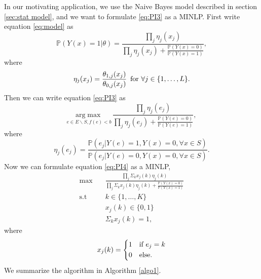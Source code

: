 \documentclass[opre,nonblindrev]{informs3} %
\newcommand{\Prob}{\mathbb{P}}
\begin{document}
In our motivating application, we use the Naive Bayes model described in section \ref{sec:stat model}, and we want to formulate \eqref{eq:PI3} as a MINLP. First write equation \eqref{eq:model} as
\begin{equation} \label{model1}
\Prob\left(Y(x) = 1 | \theta\right) =
\frac{\prod_j \eta_j(x_j)}{\prod_j \eta_j(x_j) + \frac{\Prob(Y(x)=0)}{\Prob(Y(x)=1)}},
\end{equation}
where
\begin{equation*}
\eta_j(x_j) = \frac{\theta_{1,j}(x_j)}{\theta_{0,j}(x_j)} \text{\,\,\,for $\forall j \in \{1,\ldots,L\}$}. 
\end{equation*}
Then we can write equation \eqref{eq:PI3} as
\begin{equation} \label{eq:PI4}
\underset{e \in E \backslash S, f(e)<b}{\mathrm{arg}\max} \, \frac{\prod_j \eta_j(e_j)}{\prod_j \eta_j(e_j) + \frac{\Prob(Y(e)=0)}{\Prob(Y(e)=1)}},
\end{equation}
where 
\begin{equation*}
\eta_j(e_j)=\frac{\Prob(e_j|Y(e)=1,Y(x)=0, \forall x \in S)}{\Prob(e_j|Y(e)=0,Y(x)=0, \forall x \in S)}.
\end{equation*}
Now we can formulate equation \eqref{eq:PI4} as a MINLP,
\begin{equation} \label{eq:PI5}
\begin{split}
\max \quad &\frac{\prod_j \Sigma_k x_j(k) \eta_j(k)}{\prod_j \Sigma_k x_j(k) \eta_j(k) + \frac{\Prob(Y(x)=0)}{\Prob(Y(x)=1)}} \\
\text{s.t} \quad &k \in \{1,\ldots,K\} \\
&x_j(k) \in \{0,1\}\\
&\Sigma_k x_j(k)=1,
\end{split}
\end{equation}
where
\begin{equation*}
x_j(k)=\begin{dcases}
        1 & \text{if $e_j=k$}\\
        0 & \text{else}.
\end{dcases}
\end{equation*}
We summarize the algorithm in Algorithm \ref{algo1}.
\end{document}
